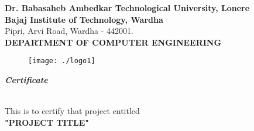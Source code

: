 \documentclass[a4paper, 12pt]{report}
\begin{document}
\begin{frontmatter}
\begin{titlepage}
\begin{center}
\textup{\large  \textbf{Dr. Babasaheb Ambedkar Technological University, Lonere}\\
\textbf{Bajaj Institute of Technology, Wardha}}\\
Pipri, Arvi Road, Wardha - 442001.\\[0.5cm]
\textbf{\large DEPARTMENT OF COMPUTER ENGINEERING}

\begin{figure}[h]
\centering
\texttt{[image: ./logo1]}
\end{figure}

\begin{LARGE}
\textbf{\textit {Certificate}}\end{LARGE}\\[1.2cm]
This is to certify that project entitled\\[0.5cm]\large\textbf{ "PROJECT TITLE"}
 

\end{center}
\end{titlepage}
\end{frontmatter}
\end{document}
